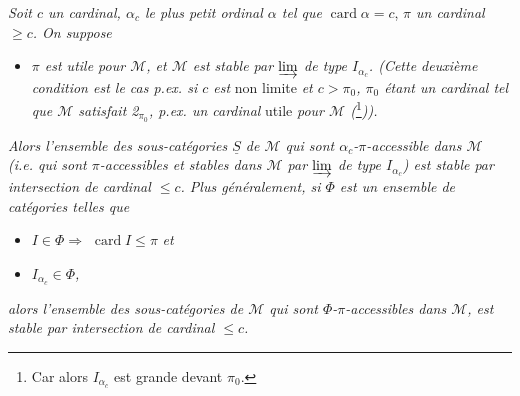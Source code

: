 \documentclass[11pt]{article}
\newcommand{\card}{\operatorname{card}}
\begin{document}
\textit{Soit $c$ un cardinal, $\alpha_c$ le plus petit ordinal $\alpha$ tel que} $\card\alpha=c$, \textit{$\pi$ un cardinal $\geqslant c$. On suppose}
\begin{itemize}
\item[$(*)$] \textit{$\pi$ est utile pour $\mathcal{M}$, et $\mathcal{M}$ est stable par $\varinjlim$ de type $I_{\alpha_c}$. (Cette deuxième condition est le cas p.ex. si $c$ est} non limite \textit{et $c>\pi_0$, $\pi_0$ étant un cardinal tel que $\mathcal{M}$ satisfait \textit{2}$_{\pi_0}$, p.ex. un cardinal} utile \textit{pour $\mathcal{M}$ (}\footnote[131]{Car alors $I_{\alpha_c}$ est grande devant $\pi_0$.}\textit{)).}
\end{itemize}
\textit{Alors l'ensemble des sous-catégories $\underline{S}$ de $\mathcal{M}$ qui sont $\alpha_c$-$\pi$-accessible dans $\mathcal{M}$ (i.e. qui sont $\pi$-accessibles et stables dans $\mathcal{M}$ par $\varinjlim$ de type $I_{\alpha_c}$) est stable par intersection de cardinal $\leqslant c$. Plus généralement, si $\Phi$ est un ensemble de catégories telles que} %
\begin{itemize}
\item[\textit{1°)}] \textit{$I\in\Phi\Longrightarrow$} $\card I\leqslant\pi$ \textit{et}
\item[\textit{2°)}] \textit{$I_{\alpha_c}\in\Phi$,}
\end{itemize}
\textit{alors l'ensemble des sous-catégories de $\mathcal{M}$ qui sont $\Phi$-$\pi$-accessibles dans $\mathcal{M}$, est stable par intersection de cardinal $\leqslant c$.}
\end{document}

